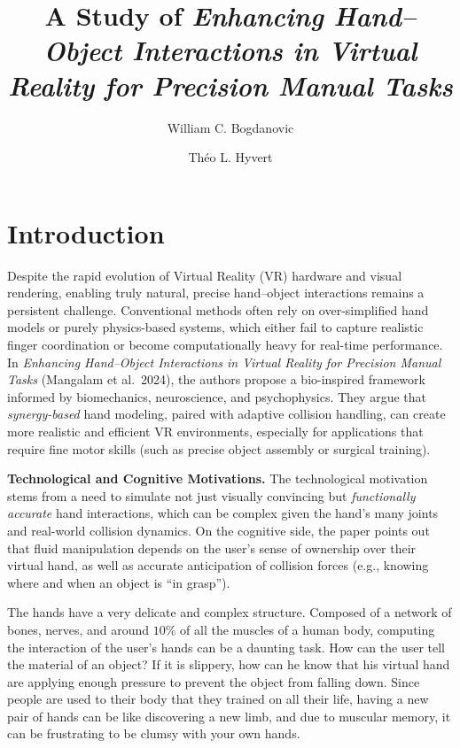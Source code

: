 \documentclass[11pt]{llncs}
\begin{document}
\title{A Study of \textit{Enhancing Hand--Object Interactions in Virtual Reality for Precision Manual Tasks}}
\author{William C. Bogdanovic \and Théo L. Hyvert}
\maketitle

\section*{Introduction}
Despite the rapid evolution of Virtual Reality (VR) hardware and visual rendering, enabling truly natural, precise hand--object interactions remains a persistent challenge. Conventional methods often rely on over-simplified hand models or purely physics-based systems, which either fail to capture realistic finger coordination or become computationally heavy for real-time performance. In \emph{Enhancing Hand--Object Interactions in Virtual Reality for Precision Manual Tasks} (Mangalam et al.\ 2024), the authors propose a bio-inspired framework informed by biomechanics, neuroscience, and psychophysics. They argue that \emph{synergy-based} hand modeling, paired with adaptive collision handling, can create more realistic and efficient VR environments, especially for applications that require fine motor skills (such as precise object assembly or surgical training).

\vspace{1em}
\noindent
\textbf{Technological and Cognitive Motivations.} The technological motivation stems from a need to simulate not just visually convincing but \emph{functionally accurate} hand interactions, which can be complex given the hand's many joints and real-world collision dynamics. On the cognitive side, the paper points out that fluid manipulation depends on the user's sense of ownership over their virtual hand, as well as accurate anticipation of collision forces (e.g., knowing where and when an object is ``in grasp'').

The hands have a very delicate and complex structure. Composed of a network of bones, nerves, and around $10 \%$ of all the muscles of a human body, computing the interaction of the user's hands can be a daunting task.
How can the user tell the material of an object? If it is slippery, how can he know that his virtual hand are applying enough pressure to prevent the object from falling down. Since people are used to their body that they trained on all their life, having a new pair of hands can be like discovering a new limb, and due to muscular memory, it can be frustrating to be clumsy with your own hands.
\end{document}
